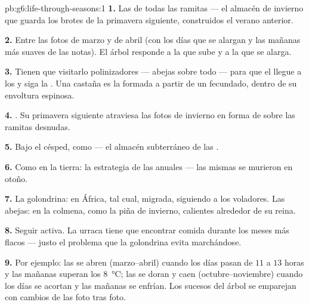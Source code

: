 \begin{solution}{pb:g6:life-through-seasons:1}
\textbf{1.} Las  de todas las ramitas --- el almacén de invierno
que guarda los brotes de la primavera siguiente, construidos el verano
anterior.

\textbf{2.} Entre las fotos de marzo y de abril (con los días que se
alargan y las mañanas más suaves de las notas). El árbol responde a la
 que sube y a la  que se alarga.

\textbf{3.} Tienen que visitarlo  polinizadores --- abejas
sobre todo --- para que el  llegue a los  y siga la
. Una castaña es la  formada a partir de un 
fecundado, dentro de su envoltura espinosa.

\textbf{4.} . Su primavera siguiente atraviesa las fotos de
invierno en forma de  sobre las ramitas desnudas.

\textbf{5.} Bajo el césped, como  --- el almacén subterráneo de
las .

\textbf{6.} Como  en la tierra: la estrategia de las anuales
--- las  mismas se murieron en otoño.

\textbf{7.} La golondrina: en África, tal cual, migrada, siguiendo a
los  voladores. Las abejas: en la colmena, como la piña de
invierno, calientes alrededor de su reina.

\textbf{8.} Seguir activa. La urraca tiene que encontrar comida
durante los meses más flacos --- justo el problema que la golondrina
evita marchándose.

\textbf{9.} Por ejemplo: las  se abren (marzo--abril) cuando los
días pasan de $11$ a $13$ horas y las mañanas superan los
\qty{8}{\degreeCelsius}; las  se doran y caen
(octubre--noviembre) cuando los días se acortan y las mañanas se
enfrían. Los sucesos del árbol se emparejan con cambios de las
 foto tras foto.


\end{solution}
